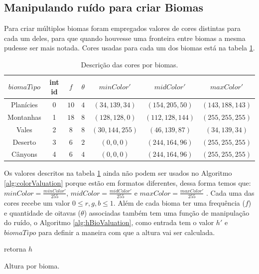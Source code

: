 \subsection{Manipulando ruído para criar Biomas}
Para criar múltiplos biomas foram empregados valores de cores distintas para cada um deles, 
para que quando houvesse uma fronteira entre biomas a mesma pudesse ser mais notada. 
Cores usadas para cada um dos biomas está na tabela \ref{tab:bioColors}.
\begin{table}[H]
    \centering
    \caption{Descrição das cores por biomas.}
    \label{tab:bioColors}
    \begin{tabular}{| c | c c c c c c|}
        \hline
        $biomaTipo$ & int id & $f$ & $\theta$ & $minColor'$ & $midColor'$ & $maxColor'$\\
        \hline
        Planícies   & 0 & $10$ & $4$ & $(34, 139, 34) $ & $(154, 205, 50) $ & $(143,188,143)  $  \\
        Montanhas & 1 & $18$ & $8$ & $(128, 128, 0) $ & $(112, 128, 144)$ & $(255, 255, 255)$  \\
        Vales   & 2 & $8$  & $8$ & $(30, 144, 255)$ & $(46, 139, 87)  $ & $(34, 139, 34)  $  \\
        Deserto   & 3 & $6$  & $2$ & $(0, 0, 0)     $ & $(244, 164, 96) $ & $(255, 255, 255)$  \\
        Cânyons  & 4 & $6$  & $4$ & $(0, 0, 0)     $ & $(244, 164, 96) $ & $(255, 255, 255)$  \\
        \hline
    \end{tabular}
\end{table}

Os valores descritos na tabela \ref{tab:bioColors} ainda não podem ser usados no
Algoritmo \ref{alg:colorValuation} porque estão em formatos diferentes, dessa forma temos
que: $minColor = \frac{minColor'}{255}$, $midColor = \frac{midColor'}{255}$ e $maxColor = \frac{maxColor'}{255}$ . Cada uma das cores recebe um valor
$0 \leq r, g, b \leq 1$.
Além de cada bioma ter uma frequência ($f$) e quantidade de oitavas ($\theta$) associadas
também tem uma função de manipulação do ruído, o Algoritmo \ref{alg:hBioValuation}, 
como entrada tem o valor $h'$ e $biomaTipo$ para definir a maneira com que a altura vai ser
calculada.

\begin{algorithm}[H]\label{alg:hBioValuation}
    retorna $h$\;
    \caption{Altura por bioma.}
\end{algorithm}

